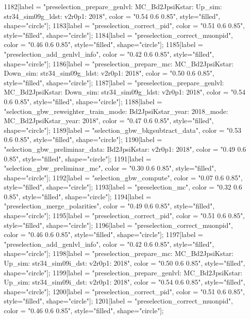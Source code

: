 {	1182[label = "preselection_prepare_genlvl\nmode: MC_Bd2JpsiKstar\npolarity: Up\nstrip_sim: str34_sim09g_ldst\nversion: v2r0p1\nyear: 2018", color = "0.54 0.6 0.85", style="filled", shape="circle"];
	1183[label = "preselection_correct_pid", color = "0.51 0.6 0.85", style="filled", shape="circle"];
	1184[label = "preselection_correct_muonpid", color = "0.46 0.6 0.85", style="filled", shape="circle"];
	1185[label = "preselection_add_genlvl_info", color = "0.42 0.6 0.85", style="filled", shape="circle"];
	1186[label = "preselection_prepare_mc\nmode: MC_Bd2JpsiKstar\npolarity: Down\nstrip_sim: str34_sim09g_ldst\nversion: v2r0p1\nyear: 2018", color = "0.50 0.6 0.85", style="filled", shape="circle"];
	1187[label = "preselection_prepare_genlvl\nmode: MC_Bd2JpsiKstar\npolarity: Down\nstrip_sim: str34_sim09g_ldst\nversion: v2r0p1\nyear: 2018", color = "0.54 0.6 0.85", style="filled", shape="circle"];
	1188[label = "selection_gbw_reweighter_train\ndata_mode: Bd2JpsiKstar\ndata_year: 2018\nmc_mode: MC_Bd2JpsiKstar\nmc_year: 2018", color = "0.47 0.6 0.85", style="filled", shape="circle"];
	1189[label = "selection_gbw_bkgsubtract_data", color = "0.53 0.6 0.85", style="filled", shape="circle"];
	1190[label = "selection_gbw_preliminar_data\nmode: Bd2JpsiKstar\nversion: v2r0p1\nyear: 2018", color = "0.49 0.6 0.85", style="filled", shape="circle"];
	1191[label = "selection_gbw_preliminar_mc", color = "0.30 0.6 0.85", style="filled", shape="circle"];
	1192[label = "selection_gbw_compute", color = "0.07 0.6 0.85", style="filled", shape="circle"];
	1193[label = "preselection_mc", color = "0.32 0.6 0.85", style="filled", shape="circle"];
	1194[label = "preselection_merge_polarities", color = "0.49 0.6 0.85", style="filled", shape="circle"];
	1195[label = "preselection_correct_pid", color = "0.51 0.6 0.85", style="filled", shape="circle"];
	1196[label = "preselection_correct_muonpid", color = "0.46 0.6 0.85", style="filled", shape="circle"];
	1197[label = "preselection_add_genlvl_info", color = "0.42 0.6 0.85", style="filled", shape="circle"];
	1198[label = "preselection_prepare_mc\nmode: MC_Bd2JpsiKstar\npolarity: Up\nstrip_sim: str34_sim09i_dst\nversion: v2r0p1\nyear: 2018", color = "0.50 0.6 0.85", style="filled", shape="circle"];
	1199[label = "preselection_prepare_genlvl\nmode: MC_Bd2JpsiKstar\npolarity: Up\nstrip_sim: str34_sim09i_dst\nversion: v2r0p1\nyear: 2018", color = "0.54 0.6 0.85", style="filled", shape="circle"];
	1200[label = "preselection_correct_pid", color = "0.51 0.6 0.85", style="filled", shape="circle"];
	1201[label = "preselection_correct_muonpid", color = "0.46 0.6 0.85", style="filled", shape="circle"];
}

